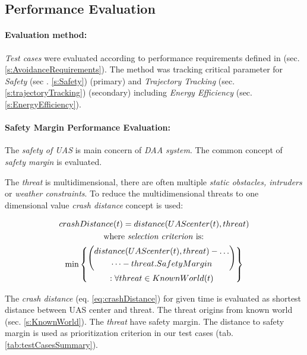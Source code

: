 \subsection{Performance Evaluation}\label{s:performanceEvaluation}
\paragraph{Evaluation method:} \emph{Test cases} were evaluated according to performance requirements defined in (sec. \ref{s:AvoidanceRequirements}). The method was tracking critical parameter for \emph{Safety} (sec . \ref{s:Safety}) (primary) and \emph{Trajectory Tracking} (sec. \ref{s:trajectoryTracking}) (secondary) including \emph{Energy Efficiency} (sec. \ref{s:EnergyEfficiency}).

\paragraph{Safety Margin Performance Evaluation:} The \emph{safety of UAS} is main concern of \emph{DAA system}. The common concept of \emph{safety margin} is evaluated. 

The \emph{threat} is multidimensional, there are often multiple \emph{static obstacles, intruders} or \emph{weather constraints}. To reduce the multidimensional threats to one dimensional value \emph{crash distance} concept is used:

\begin{multline}\label{eq:crashDistance}
    crashDistance(t) =  distance(UAScenter(t),threat) \\\text{  where \emph{selection criterion} is:  }\\ \min \left\{\begin{gathered}\left( \begin{gathered} distance(UAScenter(t),threat)-\dots\\\dots-threat.SafetyMargin\end{gathered}\right)\\:\forall threat \in KnownWorld (t)\end{gathered}\right\}
\end{multline}

\noindent The \emph{crash distance} (eq. \ref{eq:crashDistance}) for given time is evaluated as shortest distance between UAS center and threat. The threat origins from known world (sec. \ref{s:KnownWorld}). The \emph{threat} have safety margin. The distance to safety margin is used as prioritization criterion in our test cases (tab. \ref{tab:testCasesSummary}).


